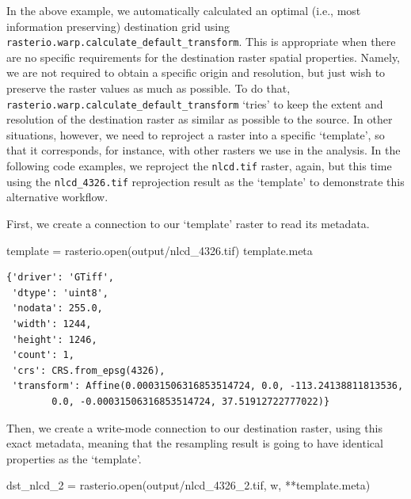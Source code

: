 \documentclass[
  letterpaper,
]{krantz}
\newenvironment{Shaded}{\begin{snugshade}}{\end{snugshade}}
\newcommand{\BuiltInTok}[1]{\textcolor[rgb]{0.00,0.23,0.31}{#1}}
\newcommand{\NormalTok}[1]{\textcolor[rgb]{0.00,0.23,0.31}{#1}}
\newcommand{\OperatorTok}[1]{\textcolor[rgb]{0.37,0.37,0.37}{#1}}
\newcommand{\StringTok}[1]{\textcolor[rgb]{0.13,0.47,0.30}{#1}}
\begin{document}
In the above example, we automatically calculated an optimal (i.e., most
information preserving) destination grid using
\texttt{rasterio.warp.calculate\_default\_transform}. This is
appropriate when there are no specific requirements for the destination
raster spatial properties. Namely, we are not required to obtain a
specific origin and resolution, but just wish to preserve the raster
values as much as possible. To do that,
\texttt{rasterio.warp.calculate\_default\_transform} `tries' to keep the
extent and resolution of the destination raster as similar as possible
to the source. In other situations, however, we need to reproject a
raster into a specific `template', so that it corresponds, for instance,
with other rasters we use in the analysis. In the following code
examples, we reproject the \texttt{nlcd.tif} raster, again, but this
time using the \texttt{nlcd\_4326.tif} reprojection result as the
`template' to demonstrate this alternative workflow.

First, we create a connection to our `template' raster to read its
metadata.

\begin{Shaded}
\begin{Highlighting}[]
\NormalTok{template }\OperatorTok{=}\NormalTok{ rasterio.}\BuiltInTok{open}\NormalTok{(}\StringTok{\textquotesingle{}output/nlcd\_4326.tif\textquotesingle{}}\NormalTok{)}
\NormalTok{template.meta}
\end{Highlighting}
\end{Shaded}

\begin{verbatim}
{'driver': 'GTiff',
 'dtype': 'uint8',
 'nodata': 255.0,
 'width': 1244,
 'height': 1246,
 'count': 1,
 'crs': CRS.from_epsg(4326),
 'transform': Affine(0.00031506316853514724, 0.0, -113.24138811813536,
        0.0, -0.00031506316853514724, 37.51912722777022)}
\end{verbatim}

Then, we create a write-mode connection to our destination raster, using
this exact metadata, meaning that the resampling result is going to have
identical properties as the `template'.

\begin{Shaded}
\begin{Highlighting}[]
\NormalTok{dst\_nlcd\_2 }\OperatorTok{=}\NormalTok{ rasterio.}\BuiltInTok{open}\NormalTok{(}\StringTok{\textquotesingle{}output/nlcd\_4326\_2.tif\textquotesingle{}}\NormalTok{, }\StringTok{\textquotesingle{}w\textquotesingle{}}\NormalTok{, }\OperatorTok{**}\NormalTok{template.meta)}
\end{Highlighting}
\end{Shaded}
\end{document}

